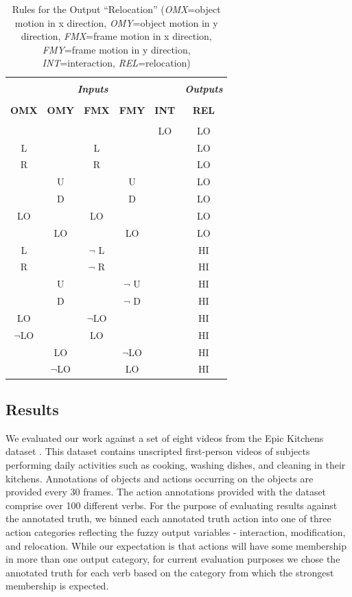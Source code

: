 \documentclass[12pt]{report}
\begin{document}
\begin{table}
\caption{Rules for the Output ``Relocation'' (\textit{OMX}=object motion in x direction, \textit{OMY}=object motion in y direction, \textit{FMX}=frame motion in x direction, \textit{FMY}=frame motion in y direction, \textit{INT}=interaction, \textit{REL}=relocation)}
\begin{center}
\begin{tabular}{cccccc}
\hline \\
\multicolumn{5}{c}{\textbf{\textit{Inputs}}}&\textbf{\textit{Outputs}} \\
\hline
\hline \\
\textbf{OMX} & \textbf{OMY} & \textbf{FMX} & \textbf{FMY} & \textbf{INT} & \textbf{REL}\\
\hline \\
 & & & & LO & LO \\
L & & L & & & LO \\
R & & R & & &  LO \\
& U & & U & & LO \\
& D & & D & & LO \\
LO & & LO & & & LO \\
 & LO & & LO & & LO \\

 L & & $\neg$ L & & & HI \\
 R & & $\neg$ R & & & HI \\
 & U & & $\neg$ U & & HI \\
 & D & & $\neg$ D & & HI \\
 LO & & $\neg$LO & & & HI \\
 $\neg$LO & & LO & & & HI \\
 & LO & & $\neg$LO & & HI \\
 & $\neg$LO & & LO & & HI \\
\hline
\end{tabular}
\label{relocateRules}
\end{center}
\end{table}


\subsection{Results}

We evaluated our work against a set of eight videos from the Epic Kitchens dataset \cite{Damen2018ScalingDataset}. This dataset contains unscripted first-person videos of subjects performing daily activities such as cooking, washing dishes, and cleaning in their kitchens. Annotations of objects and actions occurring on the objects are provided every 30 frames. The action annotations provided with the dataset comprise over 100 different verbs. For the purpose of evaluating results against the annotated truth, we binned each annotated truth action into one of three action categories reflecting the fuzzy output variables - interaction, modification, and relocation. While our expectation is that actions will have some membership in more than one output category, for current evaluation purposes we chose the annotated truth for each verb based on the category from which the strongest membership is expected. 
\end{document}
